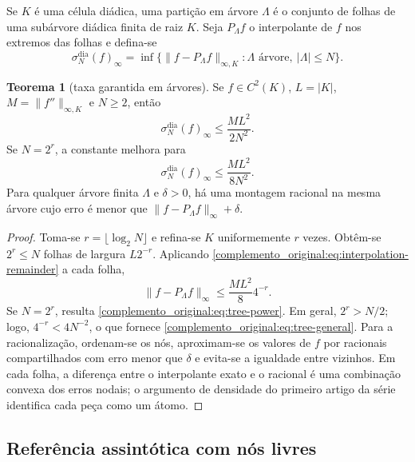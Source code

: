 \documentclass[12pt,a4paper]{article}
\theoremstyle{preciso}
\theoremstyle{definition}
\theoremstyle{preciso}
\newtheorem{theorem}[teorema]{Teorema}
\theoremstyle{preciso}
\theoremstyle{preciso}
\theoremstyle{preciso}
\theoremstyle{definition}
\theoremstyle{preciso}
\theoremstyle{definition}
\theoremstyle{preciso}
\theoremstyle{preciso}
\theoremstyle{definition}
\begin{document}
Se $K$ é uma célula diádica, uma partição em árvore $\Lambda$ é o conjunto de folhas de uma subárvore diádica finita de raiz $K$. Seja $P_\Lambda f$ o interpolante de $f$ nos extremos das folhas e defina-se
\begin{equation}
 \sigma_N^{\mathrm{dia}}(f)_\infty
 =\inf\{\|f-P_\Lambda f\|_{\infty,K}:\Lambda\text{ árvore},\ |\Lambda|\le N\}.
 \label{complemento_original:eq:sigma-dyadic}
\end{equation}

\begin{theorem}[taxa garantida em árvores]\label{map:complemento_original:6.1}\label{complemento_original:thm:tree-rate}
Se $f\in C^2(K)$, $L=|K|$, $M=\|f''\|_{\infty,K}$ e $N\ge2$, então
\begin{equation}
 \sigma_N^{\mathrm{dia}}(f)_\infty\le\frac{ML^2}{2N^2}.
 \label{complemento_original:eq:tree-general}
\end{equation}
Se $N=2^r$, a constante melhora para
\begin{equation}
 \sigma_N^{\mathrm{dia}}(f)_\infty\le\frac{ML^2}{8N^2}.
 \label{complemento_original:eq:tree-power}
\end{equation}
Para qualquer árvore finita $\Lambda$ e $\delta>0$, há uma montagem racional na mesma árvore cujo erro é menor que $\|f-P_\Lambda f\|_\infty+\delta$.
\end{theorem}

\begin{proof}
Toma-se $r=\lfloor\log_2N\rfloor$ e refina-se $K$ uniformemente $r$ vezes. Obtêm-se $2^r\le N$ folhas de largura $L2^{-r}$. Aplicando \eqref{complemento_original:eq:interpolation-remainder} a cada folha,
\[
 \|f-P_\Lambda f\|_\infty\le\frac{ML^2}{8}4^{-r}.
\]
Se $N=2^r$, resulta \eqref{complemento_original:eq:tree-power}. Em geral, $2^r>N/2$; logo, $4^{-r}<4N^{-2}$, o que fornece \eqref{complemento_original:eq:tree-general}. Para a racionalização, ordenam-se os nós, aproximam-se os valores de $f$ por racionais compartilhados com erro menor que $\delta$ e evita-se a igualdade entre vizinhos. Em cada folha, a diferença entre o interpolante exato e o racional é uma combinação convexa dos erros nodais; o argumento de densidade do primeiro artigo da série identifica cada peça como um átomo.
\end{proof}

\subsection{Referência assintótica com nós livres}
\end{document}

